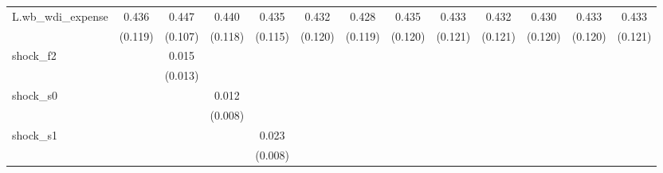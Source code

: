 {\begin{tabular}{l*{12}{c}}
\addlinespace
L.wb\_wdi\_expense&       0.436\sym{***}&       0.447\sym{***}&       0.440\sym{***}&       0.435\sym{***}&       0.432\sym{***}&       0.428\sym{***}&       0.435\sym{***}&       0.433\sym{***}&       0.432\sym{***}&       0.430\sym{***}&       0.433\sym{***}&       0.433\sym{***}\\
            &     (0.119)         &     (0.107)         &     (0.118)         &     (0.115)         &     (0.120)         &     (0.119)         &     (0.120)         &     (0.121)         &     (0.121)         &     (0.120)         &     (0.120)         &     (0.121)         \\
\addlinespace
shock\_f2    &                     &       0.015         &                     &                     &                     &                     &                     &                     &                     &                     &                     &                     \\
            &                     &     (0.013)         &                     &                     &                     &                     &                     &                     &                     &                     &                     &                     \\
\addlinespace
shock\_s0    &                     &                     &       0.012         &                     &                     &                     &                     &                     &                     &                     &                     &                     \\
            &                     &                     &     (0.008)         &                     &                     &                     &                     &                     &                     &                     &                     &                     \\
\addlinespace
shock\_s1    &                     &                     &                     &       0.023\sym{**} &                     &                     &                     &                     &                     &                     &                     &                     \\
            &                     &                     &                     &     (0.008)         &                     &                     &                     &                     &                     &                     &                     &                     \\

\end{tabular}}
